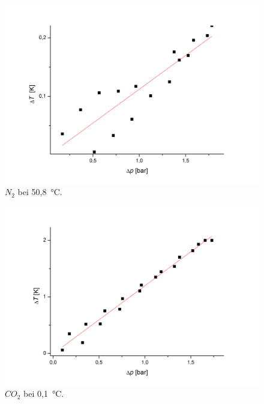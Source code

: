 \documentclass[a4paper,12pt,oneside,onecolum,final,openany]{report}
\begin{document}
\begin{center}
\begin{figure}[h]
\includegraphics[width=13.5cm]{N2bei50.png}
\caption{$N_2$ bei 50,8~°C.}
\end{figure}
\end{center}
\begin{center}
\begin{figure}[h]
\includegraphics[width=13.5cm]{CO2bei0.png}
\caption{$CO_2$ bei 0,1~°C.}
\end{figure}
\end{center}
\end{document}
